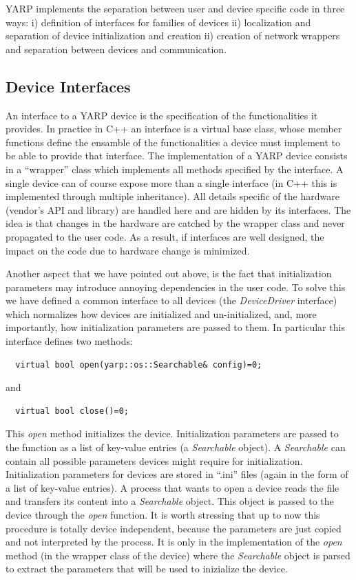 YARP implements the separation between user and device specific code 
in three ways: i) definition of interfaces for families of devices ii) 
localization and separation of device initialization and creation 
ii) creation of network wrappers and separation between devices and 
communication. 

\subsection{Device Interfaces}
An interface to a YARP device is the specification of the functionalities
it provides. In practice in C++ an interface is a virtual base class, whose 
member functions define the ensamble of the functionalities a device must 
implement to be able to provide that interface. The implementation of a 
YARP device consists in a ``wrapper'' class which implements all 
methods specified by the interface. A single device can of course expose 
more than a single interface (in C++ this is implemented through multiple
inheritance). All details specific of the hardware 
(vendor's API and library) are handled here and are hidden by its interfaces. 
The idea is that changes in the hardware are catched by the wrapper class 
and never propagated to the user code. As a result, if interfaces are 
well designed, the impact on the code due to hardware change is minimized. 

Another aspect that we have pointed out above, is the fact that 
initialization parameters may introduce annoying dependencies in the user 
code. To solve this we have defined a common interface to all devices (the 
\emph{DeviceDriver} interface) which normalizes how devices are initialized
and un-initialized, and, more importantly, how initialization parameters 
are passed to them. In particular this interface defines two methods:
\begin{verbatim}
  virtual bool open(yarp::os::Searchable& config)=0;
\end{verbatim}
and
\begin{verbatim}
  virtual bool close()=0;
\end{verbatim}
This \emph{open} method initializes the device. Initialization parameters 
are passed to the function as a list of key-value entries 
(a \emph{Searchable} object). A \emph{Searchable} can contain all 
possible parameters devices might require for initialization. Initialization 
parameters for devices 
are stored in ``.ini'' files (again in the form of a list of key-value 
entries). A process that wants to open a device reads 
the file and transfers its content into a \emph{Searchable} object. This 
object is passed to the device through the \emph{open} function. 
It is worth stressing that up to now this procedure is totally device 
independent, because the parameters are just copied and not interpreted 
by the process. It is only in the implementation of the \emph{open} method 
(in the wrapper class of the device) where the \emph{Searchable} object 
is parsed to extract the parameters that will be used to inizialize the 
device.


